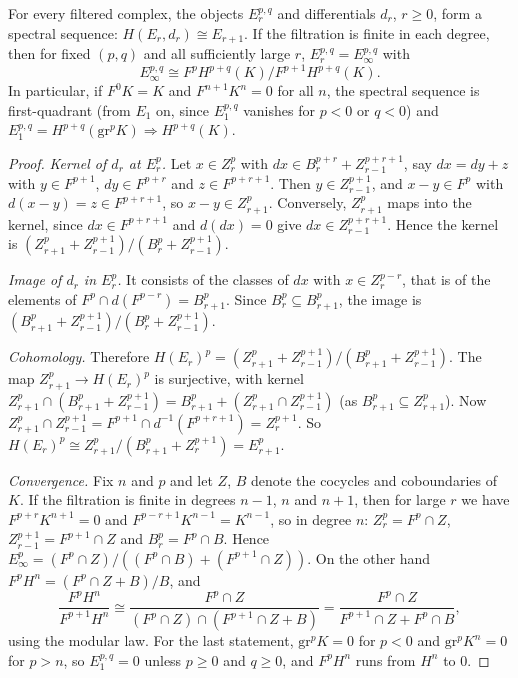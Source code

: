 \begin{theorem}\label{homological-algebra:theorem-filtered-complex}
For every filtered complex, the objects $E_r^{p,q}$ and differentials $d_r$, $r \geq 0$, form a spectral sequence:
$H(E_r, d_r) \cong E_{r+1}$. If the filtration is finite in each degree, then for fixed $(p, q)$ and all sufficiently large $r$,
$E_r^{p,q} = E_\infty^{p,q}$ with
\[
E_\infty^{p,q} \cong F^pH^{p+q}(K)/F^{p+1}H^{p+q}(K).
\]
In particular, if $F^0K = K$ and $F^{n+1}K^n = 0$ for all $n$, the spectral sequence is first-quadrant (from $E_1$ on, since
$E_1^{p,q}$ vanishes for $p < 0$ or $q < 0$) and $E_1^{p,q} = H^{p+q}(\mathrm{gr}^pK) \Rightarrow H^{p+q}(K)$.
\end{theorem}

\begin{proof}
\emph{Kernel of $d_r$ at $E_r^p$.} Let $x \in Z_r^p$ with $dx \in B_r^{p+r} + Z_{r-1}^{p+r+1}$, say $dx = dy + z$ with $y \in F^{p+1}$,
$dy \in F^{p+r}$ and $z \in F^{p+r+1}$. Then $y \in Z_{r-1}^{p+1}$, and $x - y \in F^p$ with $d(x - y) = z \in F^{p+r+1}$, so
$x - y \in Z_{r+1}^p$. Conversely, $Z_{r+1}^p$ maps into the kernel, since $dx \in F^{p+r+1}$ and $d(dx) = 0$ give
$dx \in Z_{r-1}^{p+r+1}$. Hence the kernel is $(Z_{r+1}^p + Z_{r-1}^{p+1})/(B_r^p + Z_{r-1}^{p+1})$.

\emph{Image of $d_r$ in $E_r^p$.} It consists of the classes of $dx$ with $x \in Z_r^{p-r}$, that is of the elements of
$F^p \cap d(F^{p-r}) = B_{r+1}^p$. Since $B_r^p \subseteq B_{r+1}^p$, the image is $(B_{r+1}^p + Z_{r-1}^{p+1})/(B_r^p + Z_{r-1}^{p+1})$.

\emph{Cohomology.} Therefore
$H(E_r)^p = (Z_{r+1}^p + Z_{r-1}^{p+1})/(B_{r+1}^p + Z_{r-1}^{p+1})$. The map $Z_{r+1}^p \to H(E_r)^p$ is surjective, with kernel
$Z_{r+1}^p \cap (B_{r+1}^p + Z_{r-1}^{p+1}) = B_{r+1}^p + (Z_{r+1}^p \cap Z_{r-1}^{p+1})$ (as $B_{r+1}^p \subseteq Z_{r+1}^p$). Now
$Z_{r+1}^p \cap Z_{r-1}^{p+1} = F^{p+1} \cap d^{-1}(F^{p+r+1}) = Z_r^{p+1}$. So $H(E_r)^p \cong Z_{r+1}^p/(B_{r+1}^p + Z_r^{p+1}) = E_{r+1}^p$.

\emph{Convergence.} Fix $n$ and $p$ and let $Z$, $B$ denote the cocycles and coboundaries of $K$. If the filtration is finite in degrees
$n - 1$, $n$ and $n + 1$, then for large $r$ we have $F^{p+r}K^{n+1} = 0$ and $F^{p-r+1}K^{n-1} = K^{n-1}$, so in degree $n$:
$Z_r^p = F^p \cap Z$, $Z_{r-1}^{p+1} = F^{p+1} \cap Z$ and $B_r^p = F^p \cap B$. Hence
$E_\infty^p = (F^p \cap Z)/((F^p \cap B) + (F^{p+1} \cap Z))$. On the other hand $F^pH^n = (F^p \cap Z + B)/B$, and
\[
\frac{F^pH^n}{F^{p+1}H^n} \cong \frac{F^p \cap Z}{(F^p \cap Z) \cap (F^{p+1} \cap Z + B)} = \frac{F^p \cap Z}{F^{p+1} \cap Z + F^p \cap B},
\]
using the modular law. For the last statement, $\mathrm{gr}^pK = 0$ for $p < 0$ and $\mathrm{gr}^pK^n = 0$ for $p > n$, so $E_1^{p,q} = 0$ unless
$p \geq 0$ and $q \geq 0$, and $F^pH^n$ runs from $H^n$ to $0$.
\end{proof}

